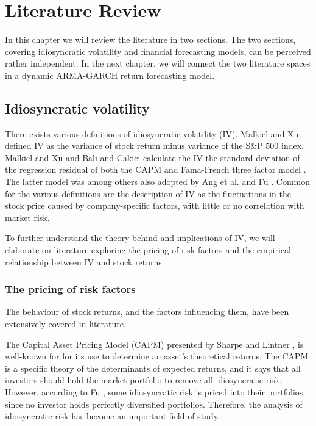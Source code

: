 \chapter{Literature Review}
\label{LR}
In this chapter we will review the literature in two sections. The two sections, covering idiosyncratic volatility and financial forecasting models, can be perceived rather independent. In the next chapter, we will connect the two literature spaces in a dynamic ARMA-GARCH return forecasting model. 

\section{Idiosyncratic volatility}  
There exists various definitions of idiosyncratic volatility (IV). Malkiel and Xu \cite{malkielxu97} defined IV as the variance of stock return minus variance of the S\&P 500 index. Malkiel and Xu \cite{malkielxu04} and Bali and Cakici \cite{balicakici08} calculate the IV the standard deviation of the regression residual of both the CAPM and Fama-French three factor model \cite{famafrench}. The latter model was among others also adopted by Ang et al. \cite{angetal06} \cite{angetal09}  and Fu \cite{Fu}. Common for the various definitions are the description of IV as the fluctuations in the stock price caused by company-specific factors, with little or no correlation with market risk.

To further understand the theory behind and implications of IV, we will elaborate on literature exploring the pricing of risk factors and the empirical relationship between IV and stock returns.

\subsection{The pricing of risk factors}
The behaviour of stock returns, and the factors influencing them, have been extensively covered in literature. 

The Capital Asset Pricing Model (CAPM) presented by Sharpe \cite{sharpe} and Lintner \cite{litner}, is well-known for for its use to determine an asset's theoretical returns. The CAPM is a specific theory of the determinants of expected returns, and it says that all investors should hold the market portfolio to remove all idiosyncratic risk. However, according to Fu \cite{Fu}, some idiosyncratic risk is priced into their portfolios, since no investor holds perfectly diversified portfolios. Therefore, the analysis of idiosyncratic risk has become an important field of study.


